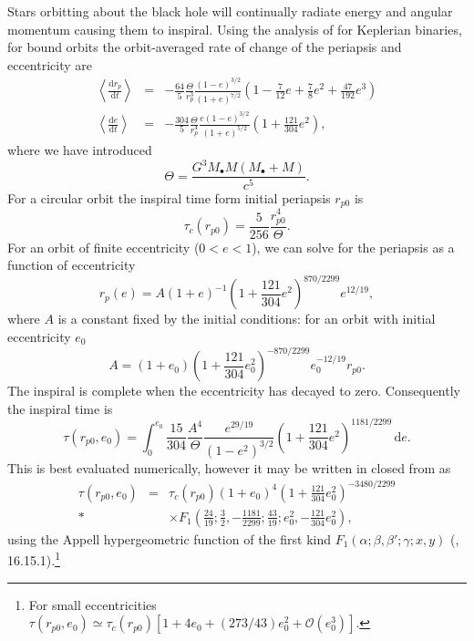 \documentclass[useAMS,usedcolumn,usegraphicx,usenatbib]{mn2e}
\newcommand{\dd}{\ensuremath{\mathrm{d}}}
\newcommand{\diff}[2]{\ensuremath{\frac{\dd {#1}}{\dd {#2}}}}
\newcommand{\intd}[4]{\ensuremath{\int_{#1}^{#2}{#3}\,\dd{#4}}}
\newcommand{\order}[1]{\ensuremath{\mathcal{O}({#1})}}
\begin{document}
Stars orbitting about the black hole will continually radiate energy and angular momentum causing them to inspiral. Using the analysis of \citet{Peters1964} for Keplerian binaries, for bound orbits the orbit-averaged rate of change of the periapsis and eccentricity are
\begin{eqnarray}
\left\langle\diff{r_p}{t}\right\rangle & = & -\frac{64}{5}\frac{\Theta}{r_p^3}\frac{(1 - e)^{3/2}}{(1 + e)^{7/2}}\left(1 - \frac{7}{12}e + \frac{7}{8}e^2 + \frac{47}{192}e^3\right) \\
\left\langle\diff{e}{t}\right\rangle & = & -\frac{304}{5}\frac{\Theta}{r_p^4}\frac{e(1 - e)^{3/2}}{(1 + e)^{5/2}}\left(1 + \frac{121}{304}e^2\right),
\end{eqnarray}
where we have introduced
\begin{equation}
\Theta = \frac{G^3M_\bullet M(M_\bullet + M)}{c^5}.
\end{equation}
For a circular orbit the inspiral time form initial periapsis $r_{p0}$ is
\begin{equation}
\tau_c(r_{p0}) = \frac{5}{256}\frac{r_{p0}^4}{\Theta}.
\end{equation}
For an orbit of finite eccentricity ($0 < e < 1$), we can solve for the periapsis as a function of eccentricity
\begin{equation}
r_p(e) = A(1 + e)^{-1}\left(1 + \frac{121}{304}e^2\right)^{870/2299}e^{12/19},
\end{equation}
where $A$ is a constant fixed by the initial conditions: for an orbit with initial eccentricity $e_0$
\begin{equation}
A = (1 + e_0)\left(1 + \frac{121}{304}e_0^2\right)^{-870/2299}e_0^{-12/19}r_{p0}.
\end{equation}
The inspiral is complete when the eccentricity has decayed to zero. Consequently the inspiral time is~\citep{Peters1964}
\begin{equation}
\tau(r_{p0},e_0) = \intd{0}{e_0}{\frac{15}{304}\frac{A^4}{\Theta}\frac{e^{29/19}}{(1-e^2)^{3/2}}\left(1 + \frac{121}{304}e^2\right)^{1181/2299}}{e}.
\end{equation}
This is best evaluated numerically, however it may be written in closed from as
\begin{eqnarray}
\tau(r_{p0},e_0) & = & \tau_c(r_{p0})(1 + e_0)^4\left(1 + \frac{121}{304}e_0^2\right)^{-3480/2299} \nonumber\\*
 & & \times F_1\left(\frac{24}{19};\frac{3}{2},-\frac{1181}{2299};\frac{43}{19};e_0^2,-\frac{121}{304}e_0^2\right),
\end{eqnarray}
using the Appell hypergeometric function of the first kind $F_1(\alpha;\beta,\beta';\gamma;x,y)$ (\citealt{Olver2010}, 16.15.1).\footnote{For small eccentricities $\tau(r_{p0},e_0) \simeq \tau_c(r_{p0})[1 + 4e_0 + (273/43)e_0^2 + \order{e_0^3}]$.}
\end{document}
